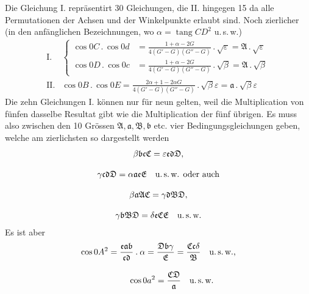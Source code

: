 Die Gleichung I. repräsentirt 30 Gleichungen, die II. hingegen 15 da alle
Permutationen der Achsen und der Winkelpunkte erlaubt sind. Noch zierlicher
(in den anfänglichen Bezeichnungen, wo $\alpha=\operatorname{tang}CD^2$ u.\,s.\,w.)
\begingroup\small\setlength{\arraycolsep}{3pt}\[
\begin{array}{ll} \mathrm{I.}&\left\{\begin{aligned} \cos 0C\mathbin{.}\cos 0d&=\frac{1+\alpha-2G}{4(G'-G)(G''-G)}\mathbin{.}\surd\varepsilon=\mathfrak{A}\mathbin{.}\surd\varepsilon\\[9pt] \cos 0D\mathbin{.}\cos 0c&=\frac{1+\alpha-2G}{4(G'-G)(G''-G)}\mathbin{.}\surd\beta=\mathfrak{A}\mathbin{.}\surd\beta \end{aligned}\right.\\[18pt] \mathrm{II.}&\displaystyle \cos 0B\mathbin{.}\cos 0E=\frac{2\alpha+1-2\alpha G}{4(G'-G)(G''-G)}\mathbin{.}\surd\beta\varepsilon=\mathfrak{a}\mathbin{.}\surd\beta\varepsilon \end{array}
\]\endgroup
Die zehn Gleichungen I. können nur für neun gelten, weil die Multiplication von fünfen dasselbe Resultat gibt wie die Multiplication der fünf übrigen.
Es muss also zwischen den 10 Grössen $\mathfrak{A},\mathfrak{a},\mathfrak{B},\mathfrak{b}$ etc. vier Bedingungsgleichungen geben, welche am zierlichsten so dargestellt werden
\[
\begin{gathered} \beta\mathfrak{b}\mathfrak{c}\mathfrak{C}=\varepsilon\mathfrak{e}\mathfrak{d}\mathfrak{D},\\[9pt] \gamma\mathfrak{c}\mathfrak{d}\mathfrak{D}=\alpha\mathfrak{a}\mathfrak{e}\mathfrak{E}\quad\text{u.\,s.\,w. oder auch}\\[9pt] \beta\mathfrak{a}\mathfrak{A}\mathfrak{C}=\gamma\mathfrak{d}\mathfrak{B}\mathfrak{D},\\[9pt] \gamma\mathfrak{b}\mathfrak{B}\mathfrak{D}=\delta\mathfrak{e}\mathfrak{C}\mathfrak{E}\quad\text{u.\,s.\,w.} \end{gathered}
\]
Es ist aber
\[
\begin{gathered}\cos 0A^2=\frac{\mathfrak{e}\mathfrak{a}\mathfrak{b}}{\mathfrak{c}\mathfrak{d}}\mathbin{.}\alpha =\frac{\mathfrak{D}\mathfrak{b}\gamma}{\mathfrak{E}} =\frac{\mathfrak{C}\mathfrak{c}\delta}{\mathfrak{B}}\quad\text{u.\,s.\,w.,} \\[9pt]\quad{}\qquad\cos 0a^2=\frac{\mathfrak{C}\mathfrak{D}}{\mathfrak{a}}\quad\text{u.\,s.\,w.}\end{gathered}
\]

